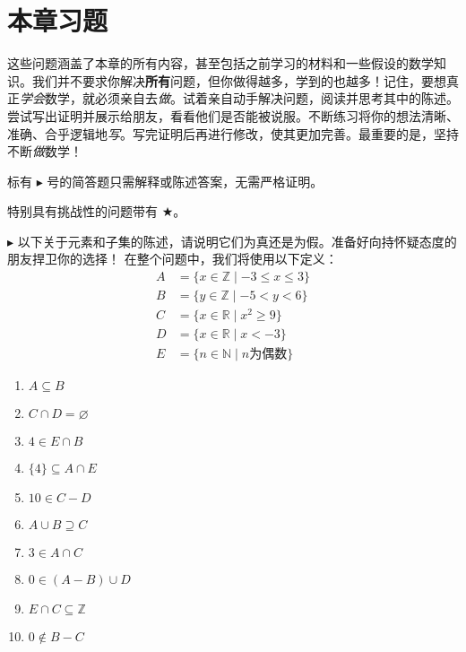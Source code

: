 \section{本章习题}

这些问题涵盖了本章的所有内容，甚至包括之前学习的材料和一些假设的数学知识。我们并不要求你解决\textbf{所有}问题，但你做得越多，学到的也越多！记住，要想真正\emph{学会}数学，就必须亲自去\emph{做}。试着亲自动手解决问题，阅读并思考其中的陈述。尝试写出证明并展示给朋友，看看他们是否能被说服。不断练习将你的想法清晰、准确、合乎逻辑地\emph{写}。写完证明后再进行修改，使其更加完善。最重要的是，坚持不断\emph{做}数学！

标有 $\blacktriangleright$ 号的简答题只需解释或陈述答案，无需严格证明。

特别具有挑战性的问题带有 $\bigstar$。

\begin{exercise}
    $\blacktriangleright$ 以下关于元素和子集的陈述，请说明它们为真还是为假。准备好向持怀疑态度的朋友捍卫你的选择！
    在整个问题中，我们将使用以下定义：
    \begin{align*}
        A &= \{x \in \mathbb{Z} \mid -3 \le x \le 3\} \\
        B &= \{y \in \mathbb{Z} \mid -5 < y < 6\} \\
        C &= \{x \in \mathbb{R} \mid x^2 \ge 9\} \\
	    D &= \{x \in \mathbb{R} \mid x < -3\} \\
        E &= \{n \in \mathbb{N} \mid n \text{为偶数} \}
    \end{align*}
    \begin{enumerate}[label=(\alph*)]
        \item $A \subseteq B$
        \item $C \cap D = \varnothing$
        \item $4 \in E \cap B$
        \item $\{4\} \subseteq A \cap E$
        \item $10 \in C - D$
        \item $A \cup B \supseteq C$
        \item $3 \in A \cap C$
        \item $0 \in (A - B) \cup D$
        \item $E \cap C \subseteq \mathbb{Z}$
        \item $0 \notin B - C$
    \end{enumerate}
\end{exercise}

